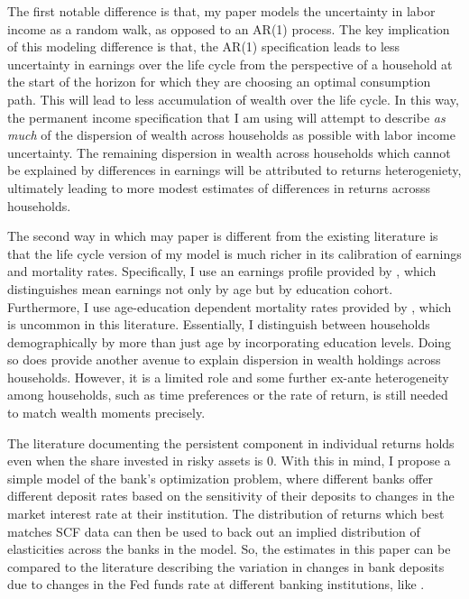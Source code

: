 \documentclass{scrartcl}
\begin{document}
The first notable difference is that, my paper models the uncertainty in labor income as a random walk, as opposed to an AR(1) process. The key implication of this modeling difference is that, the AR(1) specification leads to less uncertainty in earnings over the life cycle from the perspective of a household at the start of the horizon for which they are choosing an optimal consumption path. This will lead to less accumulation of wealth over the life cycle. In this way, the permanent income specification that I am using will attempt to describe \textit{as much} of the dispersion of wealth across households as possible with labor income uncertainty. The remaining dispersion in wealth across households which cannot be explained by differences in earnings will be attributed to returns heterogeniety, ultimately leading to more modest estimates of differences in returns acrosss households.

\par The second way in which may paper is different from the existing literature is that the life cycle version of my model is much richer in its calibration of earnings and mortality rates. Specifically, I use an earnings profile provided by \cite{Cagetti2003}, which distinguishes mean earnings not only by age but by education cohort. Furthermore, I use age-education dependent mortality rates provided by \cite{Brown2007}, which is uncommon in this literature. Essentially, I distinguish between households demographically by more than just age by incorporating education levels. Doing so does provide another avenue to explain dispersion in wealth holdings across households. However, it is a limited role and some further ex-ante heterogeneity among households, such as time preferences or the rate of return, is still needed to match wealth moments precisely. 

\par The literature documenting the persistent component in individual returns holds even when the share invested in risky assets is $0$. With this in mind, I propose a simple model of the bank's optimization problem, where different banks offer different deposit rates based on the sensitivity of their deposits to changes in the market interest rate at their institution. The distribution of returns which best matches SCF data can then be used to back out an implied distribution of elasticities across the banks in the model. So, the estimates in this paper can be compared to the literature describing the variation in changes in bank deposits due to changes in the Fed funds rate at different banking institutions, like \cite{Drechsler2017}.   
\end{document}
